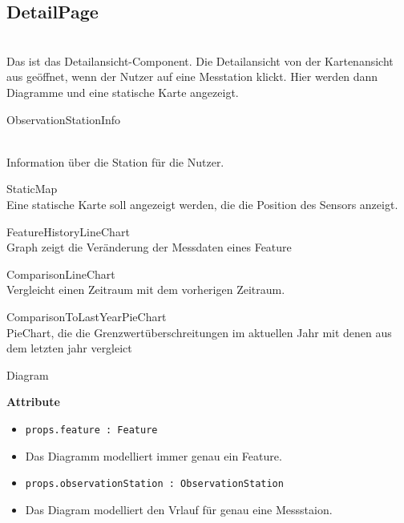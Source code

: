 \subsection{DetailPage}
\\Das ist das Detailansicht-Component. Die Detailansicht von der Kartenansicht aus geöffnet, wenn der Nutzer auf eine Messtation klickt. Hier werden dann Diagramme und eine statische Karte angezeigt.
   
    \begin{Class}{ObservationStationInfo}
      
            \\ Information über die Station für die Nutzer.
    \end{Class}

    \begin{Class}{StaticMap}
            \\Eine statische Karte soll angezeigt werden, die die Position des Sensors anzeigt.
    \end{Class}

  
    \begin{Class}{FeatureHistoryLineChart}
           \\ Graph zeigt die Veränderung der Messdaten eines Feature
    \end{Class}

    \begin{Class}{ComparisonLineChart}
            \\Vergleicht einen Zeitraum mit dem vorherigen Zeitraum.
    \end{Class}

    \begin{Class}{ComparisonToLastYearPieChart}
            \\ PieChart, die die Grenzwertüberschreitungen im aktuellen Jahr mit denen aus dem letzten jahr vergleict 
    \end{Class}

    \begin{Class}{Diagram}
        
        \textbf{Attribute}
        \begin{itemize}
            \item \texttt{props.feature : Feature}
            \item Das Diagramm modelliert immer genau ein Feature.
            \item \texttt{props.observationStation : ObservationStation}
            \item Das Diagram modelliert den Vrlauf für genau eine Messstaion.

        \end{itemize}
    \end{Class}

